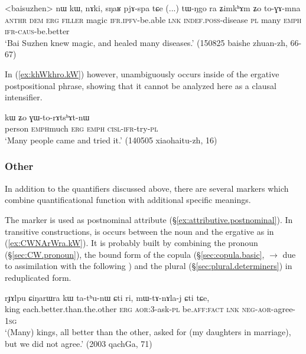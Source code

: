 \begin{exe}
\ex \label{ex:tWNgo.ZimkhAm}
\gll <baisuzhen> nɯ kɯ, nɤki, sŋaʁ pjɤ-spa tɕe (...) tɯ-ŋgo ra ʑimkʰɤm ʑo to-ɣɤ-mna \\
\textsc{anthr} \textsc{dem} \textsc{erg} \textsc{filler} magic \textsc{ifr}.\textsc{ipfv}-be.able \textsc{lnk} {  } \textsc{indef}.\textsc{poss}-disease \textsc{pl} many \textsc{emph} \textsc{ifr}-\textsc{caus}-be.better \\
\glt `Bai Suzhen knew magic, and healed many diseases.' (150825 baishe zhuan-zh, 66-67)
\end{exe}

In (\ref{ex:khWkhro.kW}) however,  unambiguously occurs inside of the ergative postpositional phrase, showing that it cannot be analyzed here as a clausal intensifier.

\begin{exe}
\ex \label{ex:khWkhro.kW}
 kɯ ʑo ɣɯ-to-rɤtsʰɤt-nɯ \\
person \textsc{emph}\redp{}much \textsc{erg} \textsc{emph} \textsc{cisl}-\textsc{ifr}-try-\textsc{pl} \\
\glt `Many people came and tried it.' (140505 xiaohaitu-zh, 16)
\end{exe}

\subsubsection{Other} \label{sec:quantifiers.other}
In addition to the quantifiers discussed above, there are several markers which combine  quantificational function with additional specific meanings.

The marker  is used as postnominal attribute (§\ref{ex:attributive.postnominal}). In transitive constructions, is occurs between the noun and the ergative  as in  (\ref{ex:CWNArWra.kW}). It is probably built by combining the pronoun   (§\ref{sec:CW.pronoun}), the bound form of the copula   (§\ref{sec:copula.basic},  $\rightarrow$  due to assimilation with the following ) and the plural  (§\ref{sec:plural.determiners}) in reduplicated form.
 
  
\begin{exe}
\ex \label{ex:CWNArWra.kW}
\gll   rɟɤlpu ɕiŋarɯra kɯ ta-tʰu-nɯ ɕti ri, mɯ-tɤ-nɤla-j ɕti tɕe, \\
king each.better.than.the.other \textsc{erg} \textsc{aor}:3\flobv{}-ask-\textsc{pl} be.\textsc{aff}:\textsc{fact} \textsc{lnk} \textsc{neg}-\textsc{aor}-agree-\textsc{1sg} \\
\glt `(Many) kings, all better than the other, asked for (my daughters in marriage), but we did not agree.' (2003 qachGa, 71)
\end{exe}

